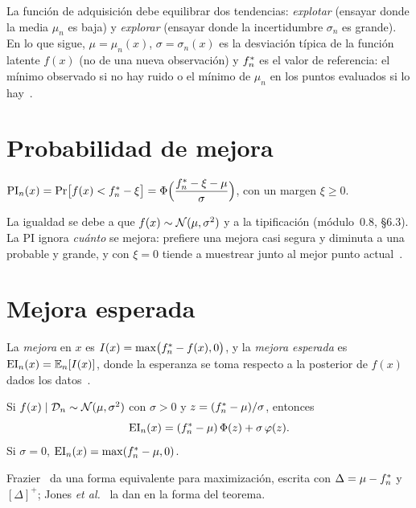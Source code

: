 La función de adquisición debe equilibrar dos tendencias: \emph{explotar} (ensayar donde la media $\mu_n$ es baja) y \emph{explorar} (ensayar donde la incertidumbre $\sigma_n$ es grande). En lo que sigue, $\mu=\mu_n(x)$, $\sigma=\sigma_n(x)$ es la desviación típica de la función latente $f(x)$ (no de una nueva observación) y $f^{*}_{n}$ es el valor de referencia: el mínimo observado si no hay ruido o el mínimo de $\mu_n$ en los puntos evaluados si lo hay~\cite[§5]{frazier}.

\section{Probabilidad de mejora}

\begin{definicion}\label{def:pi}
$\operatorname{PI}_n(x)=\Pr\bigl[f(x)<f^{*}_{n}-\xi\bigr]=\Phi\Bigl(\dfrac{f^{*}_{n}-\xi-\mu}{\sigma}\Bigr)$, con un margen $\xi\ge 0$.
\end{definicion}

La igualdad se debe a que $f(x)\sim\mathcal{N}(\mu,\sigma^2)$ y a la tipificación (módulo~0.8, §6.3). La PI ignora \emph{cuánto} se mejora: prefiere una mejora casi segura y diminuta a una probable y grande, y con $\xi=0$ tiende a muestrear junto al mejor punto actual~\cite[§7.5]{garnett}.

\section{Mejora esperada}

\begin{definicion}\label{def:ei}
La \emph{mejora} en $x$ es $I(x)=\max\bigl(f^{*}_{n}-f(x),0\bigr)$, y la \emph{mejora esperada} es $\operatorname{EI}_n(x)=\mathbb{E}_n[I(x)]$, donde la esperanza se toma respecto a la posterior de $f(x)$ dados los datos~\cite[ec.~(14)]{jones}.
\end{definicion}

\begin{teorema}\label{teo:ei}
Si $f(x)\mid\mathcal{D}_n\sim\mathcal{N}(\mu,\sigma^2)$ con $\sigma>0$ y $z=(f^{*}_{n}-\mu)/\sigma$, entonces
\[
\operatorname{EI}_n(x)=(f^{*}_{n}-\mu)\,\Phi(z)+\sigma\,\varphi(z).
\]
Si $\sigma=0$, $\operatorname{EI}_n(x)=\max(f^{*}_{n}-\mu,0)$.
\end{teorema}

Frazier~\cite[ec.~(8)]{frazier} da una forma equivalente para maximización, escrita con $\Delta=\mu-f^{*}_{n}$ y $[\Delta]^+$; Jones \emph{et al.}~\cite[ec.~(15)]{jones} la dan en la forma del teorema.


